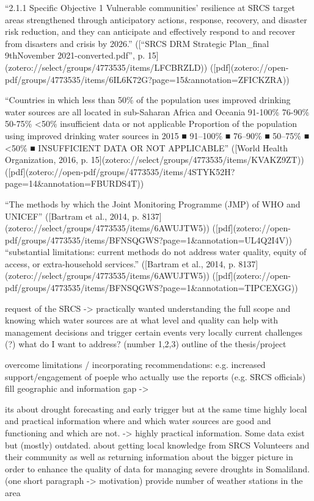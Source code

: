 “2.1.1 Specific Objective 1 Vulnerable communities’ resilience at SRCS target areas strengthened through anticipatory actions, response, recovery, and disaster risk reduction, and they can anticipate and effectively respond to and recover from disasters and crisis by 2026.” ([“SRCS DRM Strategic Plan_final 9thNovember 2021-converted.pdf”, p. 15](zotero://select/groups/4773535/items/LFCBRZLD)) ([pdf](zotero://open-pdf/groups/4773535/items/6IL6K72G?page=15&annotation=ZFICKZRA))


“Countries in which less than 50\% of the population uses improved drinking water sources are all located in sub-Saharan Africa and Oceania 91-100\% 76-90\% 50-75\% <50\% insufficient data or not applicable Proportion of the population using improved drinking water sources in 2015 ■ 91–100\% ■ 76–90\% ■ 50–75\% ■ <50\% ■ INSUFFICIENT DATA OR NOT APPLICABLE” ([World Health Organization, 2016, p. 15](zotero://select/groups/4773535/items/KVAKZ9ZT)) ([pdf](zotero://open-pdf/groups/4773535/items/4STYK52H?page=14\&annotation=FBURDS4T))

“The methods by which the Joint Monitoring Programme (JMP) of WHO and UNICEF” ([Bartram et al., 2014, p. 8137](zotero://select/groups/4773535/items/6AWUJTW5)) ([pdf](zotero://open-pdf/groups/4773535/items/BFNSQGWS?page=1&annotation=UL4Q2I4V))
“substantial limitations: current methods do not address water quality, equity of access, or extra-household services.” ([Bartram et al., 2014, p. 8137](zotero://select/groups/4773535/items/6AWUJTW5)) ([pdf](zotero://open-pdf/groups/4773535/items/BFNSQGWS?page=1&annotation=TIPCEXGG))

request of the SRCS -> practically wanted
understanding the full scope and knowing which water sources are at what level and quality can help with management decisions and trigger certain events very locally
current challenges (?) what do I want to address? (number 1,2,3)
outline of the thesis/project

overcome limitations / incorporating recommendations: e.g. increased support/engagement of poeple who actually use the reports (e.g. SRCS officials) 
fill geographic and information gap ->

its about drought forecasting and early trigger but at the same time highly local and practical information where and which water sources are good and functioning and which are not. -> highly practical information. Some data exist but (mostly) outdated.
about getting local knowledge from SRCS Volunteers and their community as well as returning information about the bigger picture
in order to enhance the quality of data for managing severe droughts in Somaliland. (one short paragraph -> motivation)
provide number of weather stations in the area

